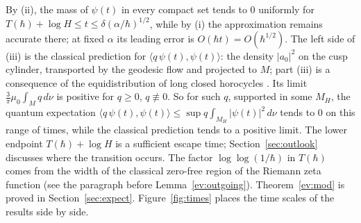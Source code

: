 \documentclass[twoside,10pt]{article}
\numberwithin{equation}{section}
\theoremstyle{slbody}
\theoremstyle{remark}
\begin{document}
By (ii), the mass of $\psi(t)$ in every compact set tends to $0$ uniformly for $T(\hbar)+\log H\le t\le\delta(\alpha/\hbar)^{1/2}$,
while by (i) the approximation remains accurate there; at fixed $\alpha$ its leading error is $O(\hbar t)=O(\hbar^{1/2})$. The
left side of (iii) is the classical prediction for $\langle q\,\psi(t),\psi(t)\rangle$: the density $|a_0|^2$ on the cusp
cylinder, transported by the geodesic flow and projected to $M$; part (iii) is a consequence of the equidistribution of
long closed horocycles \cite{Zag81,Sar81}. Its limit $\tfrac3\pi\mu_0\int_Mq\,d\nu$ is positive for
$q\ge0$, $q\not\equiv0$. So for such $q$, supported in some $M_H$, the quantum expectation
$\langle q\,\psi(t),\psi(t)\rangle\le\sup q\int_{M_H}|\psi(t)|^2\,d\nu$ tends to $0$ on this range of times, while the
classical prediction tends to a positive limit. The lower endpoint $T(\hbar)+\log H$ is a sufficient escape time;
Section~\ref{sec:outlook} discusses where the transition occurs. The factor $\log\log(1/\hbar)$ in $T(\hbar)$ comes from the width of the classical
zero-free region of the Riemann zeta function (see the paragraph before Lemma~\ref{ev:outgoing}).
Theorem~\ref{ev:mod} is proved in Section~\ref{sec:expect}. Figure~\ref{fig:times} places the time scales of the results side by side.
\end{document}
